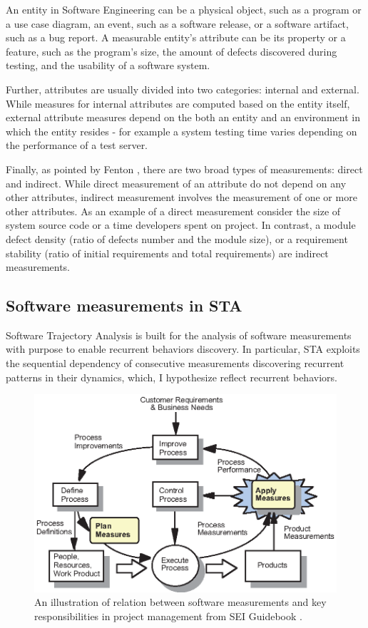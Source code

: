 An entity in Software Engineering can be a physical object, such as a program or a use case diagram, 
an event, such as a software release, or a software artifact, such as a bug report.
A measurable entity's attribute can be its property or a feature, such as the program's size, the 
amount of defects discovered during testing, and the usability of a software system.

Further, attributes are usually divided into two categories: internal and external. 
While measures for internal attributes are computed based on the entity itself, external attribute 
measures depend on the both an entity and an environment in which the entity resides - for example a 
system testing time varies depending on the performance of a test server.

Finally, as pointed by Fenton \cite{citeulike:1803429}, there are two broad types of measurements: direct
and indirect. While direct measurement of an attribute do not depend on any other attributes, 
indirect measurement involves the measurement of one or more other attributes. 
As an example of a direct measurement consider the size of system source code or a time developers spent on 
project. In contrast, a module defect density (ratio of defects number and the module size), 
or a requirement stability (ratio of initial requirements and total requirements) are indirect measurements.

\subsection{Software measurements in STA}
Software Trajectory Analysis is built for the analysis of software measurements with purpose to enable 
recurrent behaviors discovery. In particular, STA exploits the sequential dependency of consecutive 
measurements discovering recurrent patterns in their dynamics, which, I hypothesize reflect recurrent behaviors.

\begin{figure}[t]
   \centering
   \includegraphics[width=115mm]{figures/SEI-measurements.eps}
   \caption{An illustration of relation between software measurements and key responsibilities 
   in project management from SEI Guidebook \cite{citeulike:10567306}.}
   \label{fig:sei-measures}
\end{figure}

